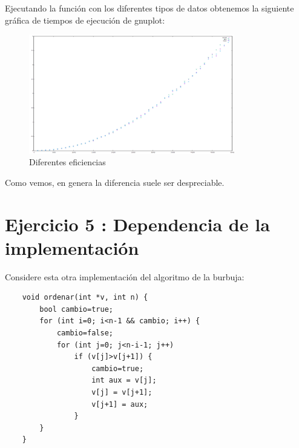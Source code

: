 \documentclass{article}
\begin{document}
	Ejecutando la funci\'on con los diferentes tipos de datos obtenemos la siguiente gr\'afica de tiempos de ejecuci\'on de gnuplot:
		\begin{figure}[H]
  		\caption{Diferentes eficiencias}
  		\centering
  		\includegraphics[width=0.8\textwidth]{ejer4/grafica.png}
	\end{figure}
	
	Como vemos, en genera la diferencia suele ser despreciable.


\clearpage
\section{Ejercicio 5 : Dependencia de la implementación}
Considere esta otra implementación del algoritmo de la burbuja:
\begin{lstlisting}
	void ordenar(int *v, int n) {
		bool cambio=true;
		for (int i=0; i<n-1 && cambio; i++) {
			cambio=false;
			for (int j=0; j<n-i-1; j++)
				if (v[j]>v[j+1]) {
					cambio=true;
					int aux = v[j];
					v[j] = v[j+1];
					v[j+1] = aux;
				}
		}
	}
\end{lstlisting}
\end{document}
